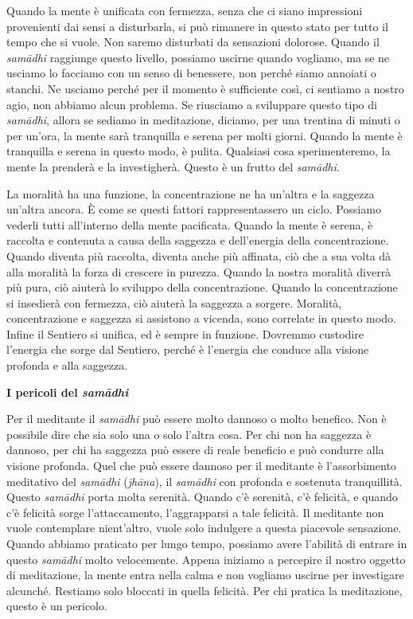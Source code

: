 Quando la mente è unificata con fermezza, senza che ci siano impressioni
provenienti dai sensi a disturbarla, si può rimanere in questo stato per
tutto il tempo che si vuole. Non saremo disturbati da sensazioni
dolorose. Quando il \emph{samādhi} raggiunge questo livello, possiamo
uscirne quando vogliamo, ma se ne usciamo lo facciamo con un senso di
benessere, non perché siamo annoiati o stanchi. Ne usciamo perché per il
momento è sufficiente così, ci sentiamo a nostro agio, non abbiamo alcun
problema. Se riusciamo a sviluppare questo tipo di \emph{samādhi},
allora se sediamo in meditazione, diciamo, per una trentina di minuti o
per un'ora, la mente sarà tranquilla e serena per molti giorni. Quando
la mente è tranquilla e serena in questo modo, è pulita. Qualsiasi cosa
sperimenteremo, la mente la prenderà e la investigherà. Questo è un
frutto del \emph{samādhi}.

La moralità ha una funzione, la concentrazione ne ha un'altra e la
saggezza un'altra ancora. È come se questi fattori rappresentassero un
ciclo. Possiamo vederli tutti all'interno della mente pacificata. Quando
la mente è serena, è raccolta e contenuta a causa della saggezza e
dell'energia della concentrazione. Quando diventa più raccolta, diventa
anche più affinata, ciò che a sua volta dà alla moralità la forza di
crescere in purezza. Quando la nostra moralità diverrà più pura, ciò
aiuterà lo sviluppo della concentrazione. Quando la concentrazione si
insedierà con fermezza, ciò aiuterà la saggezza a sorgere. Moralità,
concentrazione e saggezza si assistono a vicenda, sono correlate in
questo modo. Infine il Sentiero si unifica, ed è sempre in funzione.
Dovremmo custodire l'energia che sorge dal Sentiero, perché è l'energia
che conduce alla visione profonda e alla saggezza.

\textbf{I pericoli del \emph{samādhi}}

Per il meditante il \emph{samādhi} può essere molto dannoso o molto
benefico. Non è possibile dire che sia solo una o solo l'altra cosa. Per
chi non ha saggezza è dannoso, per chi ha saggezza può essere di reale
beneficio e può condurre alla visione profonda. Quel che può essere
dannoso per il meditante è l'assorbimento meditativo del \emph{samādhi}
(\emph{jhāna}), il \emph{samādhi} con profonda e sostenuta tranquillità.
Questo \emph{samādhi} porta molta serenità. Quando c'è serenità, c'è
felicità, e quando c'è felicità sorge l'attaccamento, l'aggrapparsi a
tale felicità. Il meditante non vuole contemplare nient'altro, vuole
solo indulgere a questa piacevole sensazione. Quando abbiamo praticato
per lungo tempo, possiamo avere l'abilità di entrare in questo
\emph{samādhi} molto velocemente. Appena iniziamo a percepire il nostro
oggetto di meditazione, la mente entra nella calma e non vogliamo
uscirne per investigare alcunché. Restiamo solo bloccati in quella
felicità. Per chi pratica la meditazione, questo è un pericolo.

